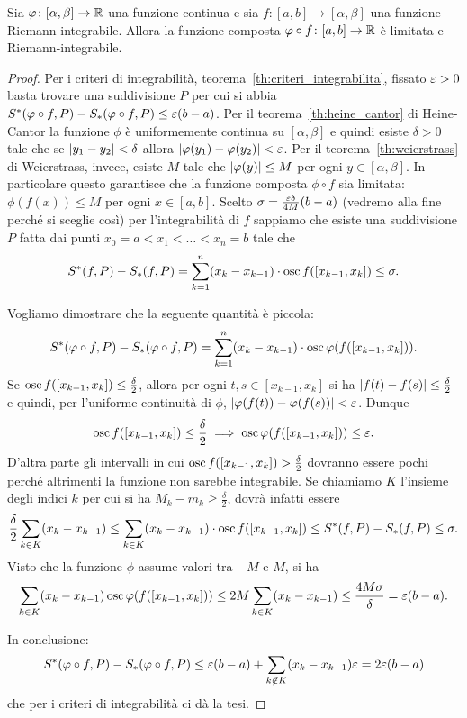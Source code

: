\begin{theorem}
  \label{th:composta_integrabile}%
  Sia $\varphi\colon [\alpha,\beta]\to {\mathbb R}$ una funzione 
  continua e sia $f\colon [a,b]\to [\alpha,\beta]$ una 
  funzione Riemann-integrabile.
  Allora la funzione composta 
  $\varphi\circ f\colon[a,b]\to {\mathbb R}$ è 
  limitata e Riemann-integrabile.
\end{theorem}
%
\begin{proof}
Per i criteri di integrabilità, teorema~\ref{th:criteri_integrabilita},
fissato $\varepsilon>0$ basta trovare una suddivisione $P$
per cui si abbia $S^*(\varphi\circ f,P) - S_*(\varphi\circ f,P)\le \varepsilon(b-a)$.
Per il teorema~\ref{th:heine_cantor} di Heine-Cantor 
la funzione $\phi$ è uniformemente continua su $[\alpha,\beta]$ 
e quindi esiste $\delta>0$ tale che se ${\left|y_1-y_2\right|}< \delta$
allora ${\left|\varphi(y_1)-\varphi(y_2)\right|}< \varepsilon$. 
Per il teorema~\ref{th:weierstrass} di Weierstrass, invece, 
esiste $M$ tale che ${\left|\varphi(y)\right|}\le M$ per ogni $y\in [\alpha,\beta]$.
In particolare questo garantisce che la funzione composta $\phi \circ f$ 
sia limitata: $\phi(f(x))\le M$ per ogni $x\in [a,b]$.
Scelto $\sigma = \frac{\varepsilon \delta}{4M} (b-a)$ 
(vedremo alla fine perché si sceglie così)
per l'integrabilità di $f$ sappiamo che 
esiste una suddivisione $P$ fatta 
dai punti $x_0=a < x_1 < \dots < x_n=b$ tale che 
%
\[
  S^*(f,P) - S_*(f,P) 
  = \sum_{k=1}^n (x_k - x_{k-1})
  \cdot \operatorname{osc} f([x_{k-1},x_k])
  \le \sigma.
\]

Vogliamo dimostrare che la seguente quantità è piccola:
\[
 S^*(\varphi\circ f,P) - S_*(\varphi\circ f,P)
 = \sum_{k=1}^n (x_k - x_{k-1}) \cdot \operatorname{osc} \varphi(f([x_{k-1},x_k])).
\]
Se $\operatorname{osc} f([x_{k-1},x_k]) \le \frac{\delta }2$, 
allora per ogni $t,s\in[x_{k-1},x_k]$ si ha 
${\left|f(t)-f(s)\right|}\le \frac{\delta}{2}$
e quindi, per l'uniforme continuità di $\phi$,
${\left|\varphi(f(t))-\varphi(f(s))\right|}<\varepsilon$.
Dunque 
\[
  \operatorname{osc} f([x_{k-1},x_k]) \le \frac{\delta}{2} 
  \implies  
  \operatorname{osc} \varphi(f([x_{k-1},x_k]))\le \varepsilon.
\] 
D'altra parte gli intervalli in cui 
$\operatorname{osc} f([x_{k-1},x_k]) > \frac{\delta}{2}$ 
dovranno essere pochi perché altrimenti la funzione non sarebbe 
integrabile.
Se chiamiamo $K$ l'insieme degli indici $k$ per cui si 
ha $M_k-m_k\ge \frac \delta 2$, dovrà infatti essere 
\[
  \frac{\delta}{2}\sum_{k\in K} (x_k-x_{k-1})
  \le \sum_{k\in K} (x_k-x_{k-1})\cdot \operatorname{osc} f([x_{k-1},x_k])
  \le S^*(f,P) - S_*(f,P) \le \sigma.
\]
Visto che la funzione $\phi$ assume valori tra $-M$ e $M$, 
si ha  
\[
   \sum_{k\in K} (x_k-x_{k-1})
   \operatorname{osc} \varphi(f([x_{k-1},x_k]))
   \le 2M \sum_{k\in K} (x_k-x_{k-1})
   \le \frac{4M\sigma}{\delta} = \varepsilon (b-a).
\]

In conclusione: 
\begin{align*}
  S^*(\varphi\circ f,P)-S_*(\varphi\circ f,P)
  \le \varepsilon (b-a) + \sum_{k\not \in K} (x_k-x_{k-1}) \varepsilon
  = 2\varepsilon (b-a)
\end{align*}
che per i criteri di integrabilità ci dà la tesi.
\end{proof}

